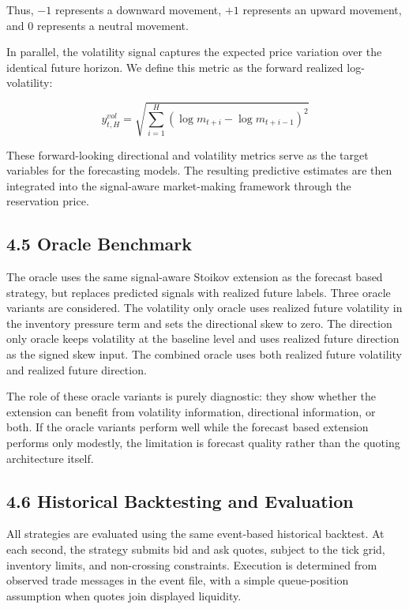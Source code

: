 \documentclass[12pt,a4paper]{article}
\begin{document}
Thus, \(-1\) represents a downward movement, \(+1\) represents an upward
movement, and \(0\) represents a neutral movement.

In parallel, the volatility signal captures the expected price variation
over the identical future horizon. We define this metric as the forward
realized log-volatility:

\[
y^{vol}_{t,H} = \sqrt{\sum_{i=1}^{H}\left(\log m_{t+i} - \log m_{t+i-1}\right)^2}
\]

These forward-looking directional and volatility metrics serve as the
target variables for the forecasting models. The resulting predictive
estimates are then integrated into the signal-aware market-making
framework through the reservation price.

\subsection{4.5 Oracle Benchmark}\label{oracle-benchmark}

The oracle uses the same signal-aware Stoikov extension as the forecast
based strategy, but replaces predicted signals with realized future
labels. Three oracle variants are considered. The volatility only oracle
uses realized future volatility in the inventory pressure term and sets
the directional skew to zero. The direction only oracle keeps volatility
at the baseline level and uses realized future direction as the signed
skew input. The combined oracle uses both realized future volatility and
realized future direction.

The role of these oracle variants is purely diagnostic: they show
whether the extension can benefit from volatility information,
directional information, or both. If the oracle variants perform well
while the forecast based extension performs only modestly, the
limitation is forecast quality rather than the quoting architecture
itself.

\subsection{4.6 Historical Backtesting and
Evaluation}\label{historical-backtesting-and-evaluation}

All strategies are evaluated using the same event-based historical
backtest. At each second, the strategy submits bid and ask quotes,
subject to the tick grid, inventory limits, and non-crossing
constraints. Execution is determined from observed trade messages in the
event file, with a simple queue-position assumption when quotes join
displayed liquidity.
\end{document}
